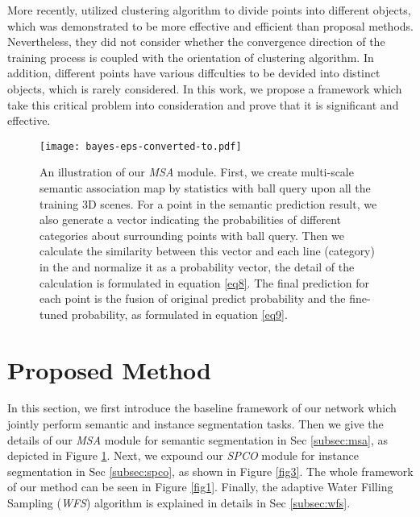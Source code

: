\documentclass{cta-author}
\begin{document}
More recently, \cite{wang2019associatively,pham2019jsis3d} utilized clustering algorithm to divide points into different objects, which was demonstrated to be more effective and efficient than proposal methods. Nevertheless, they did not consider whether the convergence direction of the training process is coupled with the orientation of clustering algorithm. In addition, different points have various diffculties to be devided into distinct objects, which is rarely considered. In this work, we propose a framework which take this critical problem into consideration and prove that it is significant and effective.
\begin{figure}[t]
  \begin{center}
   \texttt{[image: bayes-eps-converted-to.pdf]}
  \end{center}
  \caption{An illustration of our \textit{MSA} module. First, we create multi-scale semantic association map  by statistics with ball query upon all the training 3D scenes. For a point  in the semantic prediction result, we also generate a vector  indicating the probabilities of different categories about surrounding points with ball query. Then we calculate the similarity between this vector and each line (category) in the  and normalize it as a probability vector, the detail of the calculation  is formulated in equation \ref{eq8}. The final prediction for each point is the fusion of original predict probability and the fine-tuned probability, as formulated in equation \ref{eq9}.}
  \label{fig2}
\end{figure}
\section{Proposed Method}\label{sec3}
In this section, we first introduce the baseline framework of our network which jointly perform semantic and instance segmentation tasks. Then we give the details of our \textit{MSA} module for semantic segmentation in Sec \ref{subsec:msa}, as depicted in Figure \ref{fig2}. Next, we expound our \textit{SPCO} module for instance segmentation in Sec \ref{subsec:spco}, as shown in Figure \ref{fig3}. The whole framework of our method can be seen in Figure \ref{fig1}. Finally, the adaptive Water Filling Sampling (\textit{WFS}) algorithm is explained in details in Sec \ref{subsec:wfs}.
\end{document}
